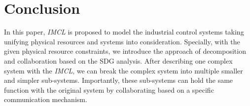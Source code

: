 \section{Conclusion}
In this paper, \emph{IMCL} is proposed to model the industrial control systems taking unifying physical resources and systems into consideration.
Specially, with the given physical resource constraints, we introduce the approach of decomposition and collaboration based on the SDG analysis.
After describing one complex system with the \emph{IMCL}, we can break the complex system into multiple smaller and simpler sub-systems. 
Importantly, these sub-systems can hold the same function with the original system by collaborating based on a specific communication mechanism.
